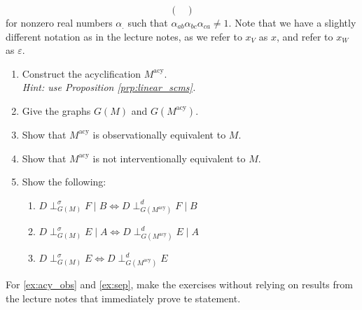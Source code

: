 \begin{enumerate}
\[\begin{pmatrix}
		\end{pmatrix}
	\]
	for nonzero real numbers $\alpha_.$ such that $\alpha_{ab}\alpha_{bc}\alpha_{ca} \neq 1$. Note that we have a slightly different notation as in the lecture notes, as we refer to $x_V$ as $x$, and refer to $x_W$ as $\varepsilon$.
	\begin{enumerate}
		\item Construct the acyclification $M^{\text{acy}}$.\\
		\emph{Hint: use Proposition \ref*{prp:linear_scms}.}
		\item Give the graphs $G(M)$ and $G(M^{\text{acy}})$.
		\item\label{ex:acy_obs} Show that $M^{\text{acy}}$ is observationally equivalent to $M$.
		\item Show that $M^{\text{acy}}$ is not interventionally equivalent to $M$.
		\item\label{ex:sep} Show the following:
		\begin{enumerate}
			\item $D \perp_{G(M)}^\sigma F \mid B \iff D \perp_{G(M^{\text{acy}})}^d F \mid B$
			\item $D \perp_{G(M)}^\sigma E \mid A \iff D \perp_{G(M^{\text{acy}})}^d E \mid A$
			\item $D \perp_{G(M)}^\sigma E \iff D \perp_{G(M^{\text{acy}})}^d E$
		\end{enumerate}
	\end{enumerate}
	For \ref{ex:acy_obs} and \ref{ex:sep}, make the exercises without relying on results from the lecture notes that immediately prove te statement.


\end{enumerate}
